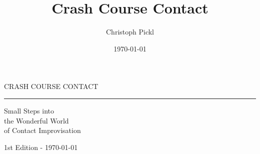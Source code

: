 \documentclass[a5paper,11pt]{book}
\title{Crash Course Contact}
\date{\today}
\author{Christoph Pickl}
\begin{document}
\begin{titlepage}
\begin{center}
	
	\vspace*{\fill}
	
	\fontsize{22}{0}\selectfont
    {\sffamily CRASH COURSE CONTACT}
	\vskip 5mm
	\rule{84mm}{0.4pt}
	\vskip 1mm
	\fontsize{15}{22}\selectfont
	{\sffamily Small Steps into \\ the Wonderful World \\ of Contact Improvisation}
	
	\vskip 70mm
	
	\vspace*{\fill}

	\fontsize{9}{0}\selectfont
	{\sffamily 1st Edition - \today}
\end{center}
\end{titlepage}

\pagestyle{empty}
\tableofcontents
\clearpage
\ifodd\value{page}\else
  \thispagestyle{empty}
\fi

\pagestyle{fancy}

















\printglossaries
\end{document}
